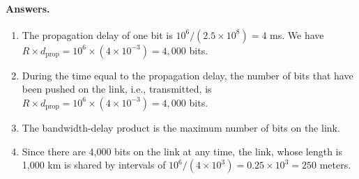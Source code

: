 
\paragraph{Answers.}

\begin{enumerate}

  \item The propagation delay of one bit is \(10^6/(2.5 \times 10^8) =
    4\) ms. We have \(R \times d_{\text{prop}} = 10^6 \times (4 \times
    10^{-3}) = 4,000\) bits.

  \item During the time equal to the propagation delay, the number of
    bits that have been pushed on the link, i.e., transmitted, is \(R
    \times d_{\text{prop}} = 10^6 \times (4 \times 10^{-3}) = 4,000\)
    bits.

  \item The bandwidth-delay product is the maximum number of bits on
    the link.

  \item Since there are 4,000 bits on the link at any time, the link,
    whose length is 1,000 km is shared by intervals of \(10^6/(4
    \times 10^3) = 0.25 \times 10^3 = 250\) meters.

\end{enumerate}
